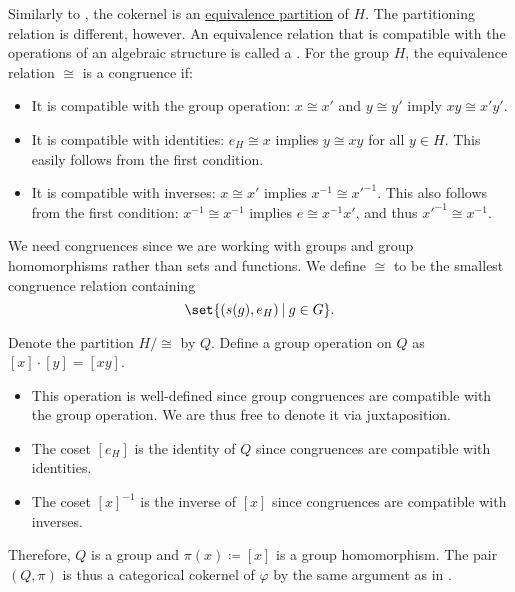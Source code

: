 \begin{definition}
\begin{thmenum}
    Similarly to , the cokernel is an \hyperref[thm:equivalence_partition]{equivalence partition} of \( H \). The partitioning relation is different, however. An equivalence relation that is compatible with the operations of an algebraic structure is called a . For the group \( H \), the equivalence relation \( \cong \) is a congruence if:
    \begin{itemize}
      \item It is compatible with the group operation: \( x \cong x' \) and \( y \cong y' \) imply \( x y \cong x' y' \).
      \item It is compatible with identities: \( e_H \cong x \) implies \( y \cong xy \) for all \( y \in H \). This easily follows from the first condition.
      \item It is compatible with inverses: \( x \cong x' \) implies \( x^{-1} \cong x'^{-1} \). This also follows from the first condition: \( x^{-1} \cong x^{-1} \) implies \( e \cong x^{-1} x' \), and thus \( x'^{-1} \cong x^{-1} \).
    \end{itemize}

    We need congruences since we are working with groups and group homomorphisms rather than sets and functions. We define \( \cong \) to be the smallest congruence relation containing
    \begin{equation*}
      \set{ (s(g), e_H) \given g \in G }.
    \end{equation*}

    Denote the partition \( H / {\cong} \) by \( Q \). Define a group operation on \( Q \) as \( [x] \cdot [y] = [xy] \).
    \begin{itemize}
      \item This operation is well-defined since group congruences are compatible with the group operation. We are thus free to denote it via juxtaposition.
      \item The coset \( [e_H] \) is the identity of \( Q \) since congruences are compatible with identities.
      \item The coset \( [x]^{-1} \) is the inverse of \( [x] \) since congruences are compatible with inverses.
    \end{itemize}

    Therefore, \( Q \) is a group and \( \pi(x) \coloneqq [x] \) is a group homomorphism. The pair \( (Q, \pi) \) is thus a categorical cokernel of \( \varphi \) by the same argument as in .


\end{thmenum}
\end{definition}
